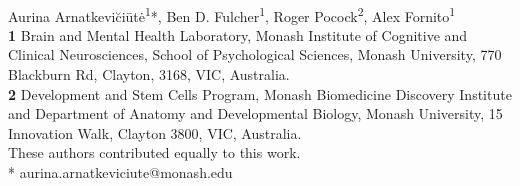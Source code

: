 \documentclass[10pt,letterpaper]{article}
\date{}
\begin{document}
\vspace*{0.2in}

\begin{flushleft}
{\Large
\textbf{} %
}
\newline
\\
Aurina Arnatkevi\u{c}i\={u}t\.{e}\textsuperscript{1\Yinyang}*,
Ben D. Fulcher\textsuperscript{1\Yinyang},
Roger Pocock\textsuperscript{2},
Alex Fornito\textsuperscript{1}\\
\bigskip
\textbf{1} Brain and Mental Health Laboratory, Monash Institute of Cognitive and Clinical Neurosciences, School of Psychological Sciences, Monash University, 770 Blackburn Rd, Clayton, 3168, VIC, Australia.\\
\textbf{2} Development and Stem Cells Program, Monash Biomedicine Discovery Institute and Department of Anatomy and Developmental Biology, Monash University, 15 Innovation Walk, Clayton 3800, VIC, Australia.
\\
\bigskip
%
\Yinyang These authors contributed equally to this work.\\
%
%
%
%
%
* aurina.arnatkeviciute@monash.edu

\end{flushleft}
\end{document}
